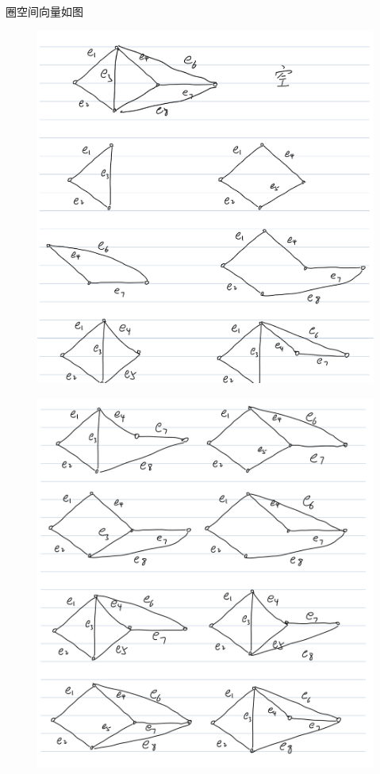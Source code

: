 \documentclass{article}
\begin{document}
圈空间向量如图
\begin{figure}[htbp]
    \centering
    \includegraphics[scale=0.2]{2.PNG}
\end{figure}

\begin{figure}[htbp]
    \centering
    \includegraphics[scale=0.2]{3.PNG}
\end{figure}
\end{document}
